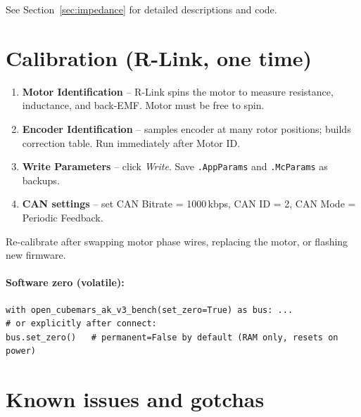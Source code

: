 \documentclass[11pt,a4paper]{article}
\begin{document}
See Section~\ref{sec:impedance} for detailed descriptions and code.

\section{Calibration (R-Link, one time)}
\label{sec:cal}

\begin{enumerate}
  \item \textbf{Motor Identification} -- R-Link spins the motor to measure
        resistance, inductance, and back-EMF.  Motor must be free to spin.
  \item \textbf{Encoder Identification} -- samples encoder at many rotor
        positions; builds correction table.  Run immediately after Motor ID.
  \item \textbf{Write Parameters} -- click \emph{Write}.  Save
        \texttt{.AppParams} and \texttt{.McParams} as backups.
  \item \textbf{CAN settings} -- set CAN Bitrate = 1000\,kbps,
        CAN ID = 2, CAN Mode = Periodic Feedback.
\end{enumerate}

Re-calibrate after swapping motor phase wires, replacing the motor, or
flashing new firmware.

\paragraph{Software zero (volatile):}
\begin{lstlisting}
with open_cubemars_ak_v3_bench(set_zero=True) as bus: ...
# or explicitly after connect:
bus.set_zero()   # permanent=False by default (RAM only, resets on power)
\end{lstlisting}

\section{Known issues and gotchas}
\label{sec:gotchas}
\end{document}

